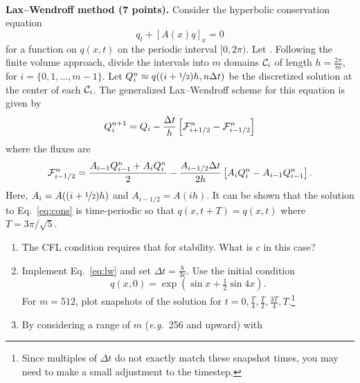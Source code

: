 \documentclass[11pt]{article}
\begin{document}
\begin{problem} \\ 
    \textbf{Lax--Wendroff method (7 points).}
        Consider the hyperbolic conservation equation
        \begin{equation}
          q_t + [A(x) q]_x =0 \label{eq:cons}
        \end{equation}
        for a function on $q(x,t)$ on the periodic interval $[0,2\pi)$. Let
        . Following the finite volume approach,
        divide the intervals into $m$ domains $\mathcal{C}_i$ of length
        $h=\tfrac{2\pi}{m}$, for $i=\{0,1,\ldots,m-1\}$. Let $Q_i^n \approx q(
          (i+\nicefrac12)h, n\Delta t)$ be the discretized solution at the center of
        each $\mathcal{C}_i$. The generalized Lax--Wendroff scheme for this equation is
        given by
        \begin{equation}
          Q^{n+1}_i = Q_i - \frac{\Delta t}{h} \left[ \mathcal{F}_{i+1/2}^n - \mathcal{F}_{i-1/2}^n\right]
        \end{equation}
        where the fluxes are
        \begin{equation}
          \mathcal{F}_{i-1/2}^n = \frac{A_{i-1} Q_{i-1}^n + A_i Q_i^n}{2} - \frac{A_{i-1/2}\Delta t}{2h} \left[A_iQ^n_i - A_{i-1}Q_{i-1}^n\right]. \label{eq:lw}
        \end{equation}
        Here, $A_i = A( (i+\nicefrac12)h)$ and $A_{i-1/2}=A(ih)$. It can be shown
        that the solution to Eq.~\eqref{eq:cons} is time-periodic so that
        $q(x,t+T)=q(x,t)$ where $T=3\pi/\sqrt{5}$.
        \begin{enumerate}
          \item The CFL condition requires that 
                for stability. What is $c$ in this case?
          \item Implement Eq.~\eqref{eq:lw} and set $\Delta t = \tfrac{h}{3c}$. Use
                the initial condition
                \begin{equation}
                  q(x,0) = \exp\left(\sin x + \tfrac{1}{2}\sin 4x\right). \label{eq:lwic}
                \end{equation}
                For $m=512$, plot snapshots of the solution for
                $t=0,\tfrac{T}{4},\tfrac{T}{2},\tfrac{3T}{4},T$.\footnote{Since
                  multiples of $\Delta t$ do not exactly match these snapshot times, you
                  may need to make a small adjustment to the timestep.}
          \item By considering a range of $m$ (\textit{e.g.}~256 and upward) with

\end{enumerate}
\end{problem}
\end{document}
